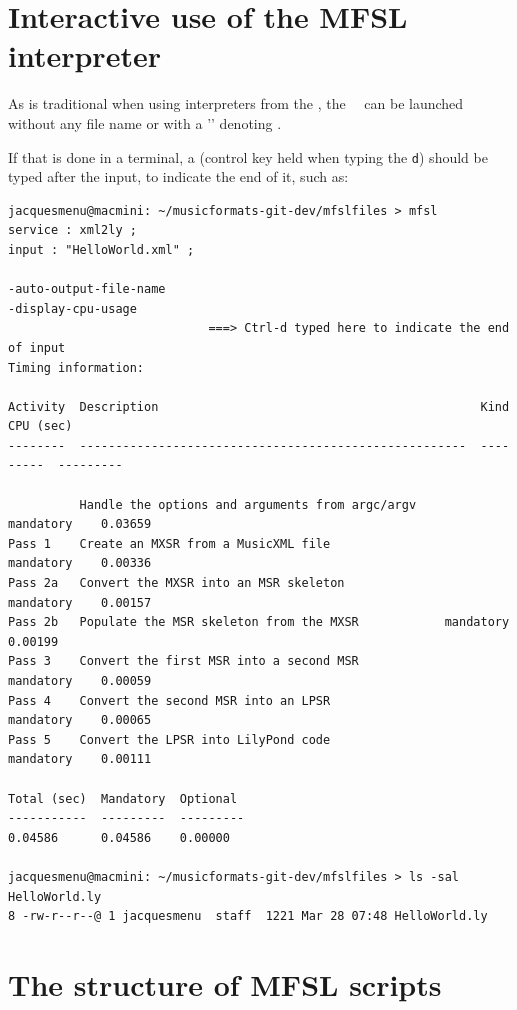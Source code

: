 \section{Interactive use of the MFSL interpreter}

As is traditional when using interpreters from the \CLI, the \mfslInterp\ \mfslExec\ can be launched without any file name or with a '\code{-}' denoting \standardInput.

If that is done in a terminal, a  (control key held when typing the {\tt d}) should be typed after the input, to indicate the end of it, such as:
\begin{lstlisting}[language=Terminal]
jacquesmenu@macmini: ~/musicformats-git-dev/mfslfiles > mfsl
service : xml2ly ;
input : "HelloWorld.xml" ;

-auto-output-file-name
-display-cpu-usage
							===> Ctrl-d typed here to indicate the end of input
Timing information:

Activity  Description                                             Kind       CPU (sec)
--------  ------------------------------------------------------  ---------  ---------

          Handle the options and arguments from argc/argv         mandatory    0.03659
Pass 1    Create an MXSR from a MusicXML file                  mandatory    0.00336
Pass 2a   Convert the MXSR into an MSR skeleton                    mandatory    0.00157
Pass 2b   Populate the MSR skeleton from the MXSR            mandatory    0.00199
Pass 3    Convert the first MSR into a second MSR                 mandatory    0.00059
Pass 4    Convert the second MSR into an LPSR                     mandatory    0.00065
Pass 5    Convert the LPSR into LilyPond code                 mandatory    0.00111

Total (sec)  Mandatory  Optional
-----------  ---------  ---------
0.04586      0.04586    0.00000

jacquesmenu@macmini: ~/musicformats-git-dev/mfslfiles > ls -sal HelloWorld.ly
8 -rw-r--r--@ 1 jacquesmenu  staff  1221 Mar 28 07:48 HelloWorld.ly
\end{lstlisting}


\section{The structure of MFSL scripts}

